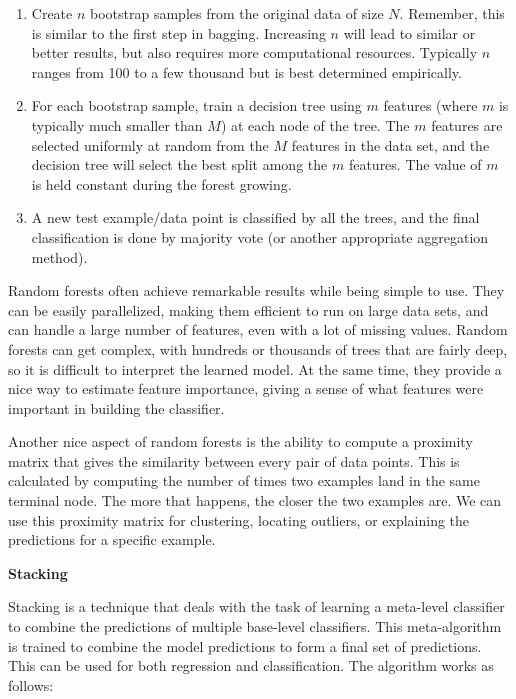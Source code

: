 \documentclass[]{krantz}
\begin{document}
\begin{enumerate}
\def\labelenumi{\arabic{enumi}.}
\item
  Create \(n\) bootstrap samples from the original data of size \(N\).
  Remember, this is similar to the first step in bagging. Increasing
  \(n\) will lead to similar or better results, but also requires more
  computational resources. Typically \(n\) ranges from 100 to a few
  thousand but is best determined empirically.
\item
  For each bootstrap sample, train a decision tree using \(m\) features
  (where \(m\) is typically much smaller than \(M\)) at each node of the
  tree. The \(m\) features are selected uniformly at random from the
  \(M\) features in the data set, and the decision tree will select the
  best split among the \(m\) features. The value of \(m\) is held
  constant during the forest growing.
\item
  A new test example/data point is classified by all the trees, and the
  final classification is done by majority vote (or another appropriate
  aggregation method).
\end{enumerate}

Random forests often achieve remarkable results while being simple to
use. They can be easily parallelized, making them efficient to run on
large data sets, and can handle a large number of features, even with a
lot of missing values. Random forests can get complex, with hundreds or
thousands of trees that are fairly deep, so it is difficult to interpret
the learned model. At the same time, they provide a nice way to estimate
feature importance, giving a sense of what features were important in
building the classifier.

Another nice aspect of random forests is the ability to compute a
proximity matrix that gives the similarity between every pair of data
points. This is calculated by computing the number of times two examples
land in the same terminal node. The more that happens, the closer the
two examples are. We can use this proximity matrix for clustering,
locating outliers, or explaining the predictions for a specific example.

\textbf{Stacking}

Stacking is a technique that deals with the task of learning a
meta-level classifier to combine the predictions of multiple base-level
classifiers. This meta-algorithm is trained to combine the model
predictions to form a final set of predictions. This can be used for
both regression and classification. The algorithm works as follows:
\end{document}
